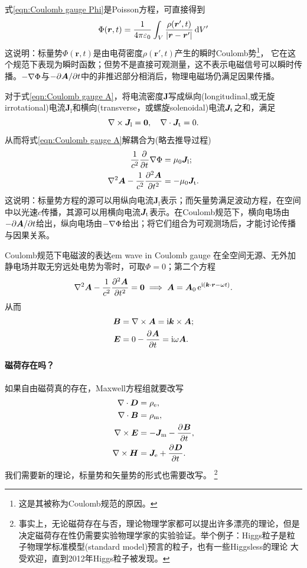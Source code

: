 式\eqref{eqn:Coulomb gauge Phi}是Poisson方程，可直接得到
\begin{equation}
    \label{eq:ed-coulomb-gauge-potential}
    \Phi(\bm r,t) = \frac1{4\pi\varepsilon_0}\int_V\frac{\rho(\bm r',t)}{\abs{\bm r - \bm r'}}\d V'
 \end{equation}
这说明：标量势$\Phi(\bm r,t)$是由电荷密度$\rho(\bm r',t)$产生的瞬时Coulomb势\footnote{这是其被称为Coulomb规范的原因。}，%
它在这个规范下表现为瞬时函数；但势不是直接可观测量，这不表示电磁信号可以瞬时传播。$-\grad\Phi$与$-\p\bm A/\p t$中的非推迟部分相消后，物理电磁场仍满足因果传播。

对于式\eqref{eqn:Coulomb gauge A}，将电流密度$\bm J$写成纵向(longitudinal,或无旋irrotational)电流$\bm J_{\mathrm{l}}$和横向(transverse，或螺旋solenoidal)电流$\bm J_\transv$之和，满足
\[
    \curl\bm J_{\mathrm{l}} = \bm 0,\quad\div\bm J_\transv = 0.
\]
从而将式\eqref{eqn:Coulomb gauge A}解耦合为(略去推导过程)
\begin{subequations}
    \begin{align}
        \frac1{c^2}\pp t\grad\Phi &= \mu_0\bm J_{\mathrm{l}};\\
        \laplacian\bm A - \frac1{c^2}\pv[2]{\bm A}t &= -\mu_0\bm J_\transv.
    \end{align}
\end{subequations}
这说明：标量势方程的源可以用纵向电流$\bm J_{\mathrm{l}}$表示；而矢量势满足波动方程，在空间中以光速$c$传播，其源可以用横向电流$\bm J_\transv$表示。在Coulomb规范下，横向电场由$-\p\bm A/\p t$给出，纵向电场由$-\grad\Phi$给出；将它们组合为可观测场后，才能讨论传播与因果关系。

\begin{example}{Coulomb规范下电磁波的表达}{em wave in Coulomb gauge}
    在全空间无源、无外加静电场并取无穷远处电势为零时，可取$\Phi = 0$；第二个方程
    \[
        \laplacian\bm A - \frac1{c^2}\pv[2]{\bm A}t = \bm 0 \implies \bm A = \bm A_0\e^{\i(\bm k\cdot\bm r-\omega t)}.
    \]
    从而
    \begin{align*}
        \bm B &= \curl\bm A = \i\bm k \times \bm A;\\
        \bm E &= 0 - \pv{\bm A}t = \i\omega\bm A.
    \end{align*}
\end{example}
\paragraph{磁荷存在吗？}
如果自由磁荷真的存在，Maxwell方程组就要改写
\begin{align*}
    \div\bm D &= \rho_\electric,\\
    \div\bm B &= \rho_\magnetic,\\
    \curl\bm E &= -\bm J_\magnetic - \pv{\bm B}t,\\
    \curl\bm H &= \bm J_\electric + \pv{\bm D}t.
\end{align*}
我们需要新的理论，标量势和矢量势的形式也需要改写。
\footnote{事实上，无论磁荷存在与否，理论物理学家都可以提出许多漂亮的理论，但是决定磁荷存在性仍需要实验物理学家的实验验证。举个例子：Higgs粒子是粒子物理学标准模型(standard model)预言的粒子，也有一些Higgsless的理论
大受欢迎，直到2012年Higgs粒子被发现。}
